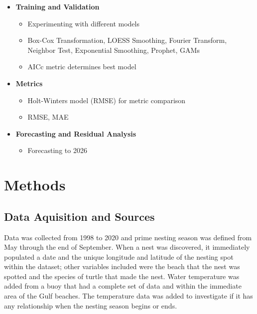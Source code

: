 \documentclass[
  letterpaper,
  DIV=11,
  numbers=noendperiod]{scrartcl}
\providecommand{\tightlist}{%
  \setlength{\itemsep}{0pt}\setlength{\parskip}{0pt}}\usepackage{longtable,booktabs,array}
\begin{document}
\begin{itemize}
  \begin{itemize}
  \tightlist
  \item
    PACF \& ACF - Partial and Autocorrelation Function (Plot) - Visual
    Verification
  \item
    Determining p, q, d, P, Q, D
  \item
    Define the model e.g., ARMA, ARIMA, SARIMA, etc
  \end{itemize}
\item
  \textbf{Training and Validation}

  \begin{itemize}
  \tightlist
  \item
    Experimenting with different models
  \item
    Box-Cox Transformation, LOESS Smoothing, Fourier Transform, Neighbor
    Test, Exponential Smoothing, Prophet, GAMs
  \item
    AICc metric determines best model
  \end{itemize}
\item
  \textbf{Metrics}

  \begin{itemize}
  \tightlist
  \item
    Holt-Winters model (RMSE) for metric comparison
  \item
    RMSE, MAE
  \end{itemize}
\item
  \textbf{Forecasting and Residual Analysis}

  \begin{itemize}
  \tightlist
  \item
    Forecasting to 2026
  \end{itemize}
\end{itemize}

\section{Methods}\label{methods}

\subsection{Data Aquisition and
Sources}\label{data-aquisition-and-sources}

Data was collected from 1998 to 2020 and prime nesting season was
defined from May through the end of September. When a nest was
discovered, it immediately populated a date and the unique longitude and
latitude of the nesting spot within the dataset; other variables
included were the beach that the nest was spotted and the species of
turtle that made the nest. Water temperature was added from a buoy that
had a complete set of data and within the immediate area of the Gulf
beaches. The temperature data was added to investigate if it has any
relationship when the nesting season begins or ends.
\end{document}
